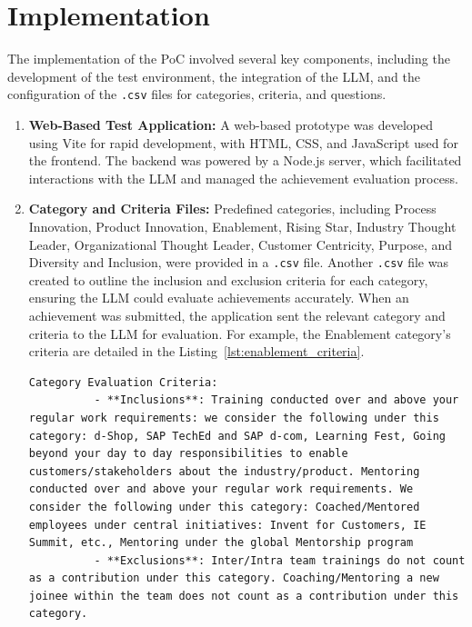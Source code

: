 \section{Implementation}
The implementation of the \ac{PoC} involved several key components, including the development of the test environment, the integration of the \ac{LLM}, 
and the configuration of the \texttt{.csv} files for categories, criteria, and questions.

\begin{enumerate}
    \item \textbf{Web-Based Test Application:} A web-based prototype was developed using Vite for rapid development, with HTML, CSS, and JavaScript used for the frontend. 
    The backend was powered by a Node.js server, which facilitated interactions with the \ac{LLM} and managed the achievement evaluation process.
    
    \item \textbf{Category and Criteria Files:} Predefined categories, including Process Innovation, Product Innovation, Enablement, Rising Star, Industry Thought Leader, Organizational Thought Leader, 
    Customer Centricity, Purpose, and Diversity and Inclusion, were provided in a \texttt{.csv} file. Another \texttt{.csv} file was created to outline the inclusion and exclusion criteria for each category, 
    ensuring the \ac{LLM} could evaluate achievements accurately. When an achievement was submitted, the application sent the relevant category and criteria to the \ac{LLM} for evaluation. 
    For example, the Enablement category's criteria are detailed in the Listing~\ref{lst:enablement_criteria}.    
    
    \begin{lstlisting}[caption={Evaluation Criteria Enablement}, label={lst:enablement_criteria}]
        Category Evaluation Criteria:
          - **Inclusions**: Training conducted over and above your regular work requirements: we consider the following under this category: d-Shop, SAP TechEd and SAP d-com, Learning Fest, Going beyond your day to day responsibilities to enable customers/stakeholders about the industry/product. Mentoring conducted over and above your regular work requirements. We consider the following under this category: Coached/Mentored employees under central initiatives: Invent for Customers, IE Summit, etc., Mentoring under the global Mentorship program
          - **Exclusions**: Inter/Intra team trainings do not count as a contribution under this category. Coaching/Mentoring a new joinee within the team does not count as a contribution under this category.
    \end{lstlisting}
    

\end{enumerate}
